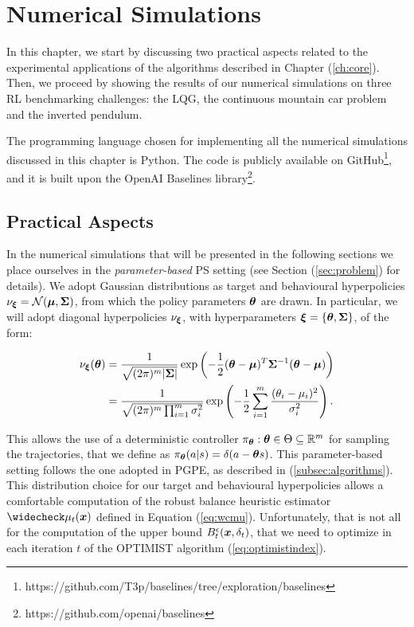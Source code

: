
\chapter{Numerical Simulations} \label{ch:experiments}
In this chapter, we start by discussing two practical aspects related to the experimental applications of the algorithms described in Chapter (\ref{ch:core}). Then, we proceed by showing the results of our numerical simulations on three \gls{RL} benchmarking challenges: the \gls{LQG}, the continuous mountain car problem and the inverted pendulum.

The programming language chosen for implementing all the numerical simulations discussed in this chapter is Python. The code is publicly available on GitHub\footnote{https://github.com/T3p/baselines/tree/exploration/baselines}, and it is built upon the OpenAI Baselines library\footnote{https://github.com/openai/baselines}.

\section{Practical Aspects} \label{sec:practical}
In the numerical simulations that will be presented in the following sections we place ourselves in the \emph{parameter-based} \gls{PS} setting (see Section (\ref{sec:problem}) for details). We adopt Gaussian distributions as target and behavioural hyperpolicies $\nu_{\boldsymbol{\xi}}= \mathcal{N}(\boldsymbol{\mu},\boldsymbol{\Sigma})$, from which the policy parameters $\boldsymbol{\theta}$ are drawn. In particular, we will adopt diagonal hyperpolicies $\nu_{\boldsymbol{\xi}}$, with hyperparameters $\boldsymbol{\xi}=\{\boldsymbol{\theta},\boldsymbol{\Sigma}\}$, of the form: 

\begin{align}
\nu_{\boldsymbol{\xi}}(\boldsymbol{\theta}) & = \frac{1}{\sqrt{(2\pi)^m |\boldsymbol{\Sigma} |}}\exp\left(
	-\frac{1}{2} (\boldsymbol{\theta} - \boldsymbol{\mu} )^T\boldsymbol{\Sigma}^{-1}(\boldsymbol{\theta} - \boldsymbol{\mu} )\right)\\
	& = \frac{1}{\sqrt{(2\pi)^m \prod_{i=1}^{m} \sigma_{i}^2}}\exp\left(
	-\frac{1}{2} \sum\limits_{i=1}^m\frac{(\theta_{i}-\mu_{i})^2}{\sigma_{i}^2}\right).
\end{align}

This allows the use of a deterministic controller $\pi_{\boldsymbol{\theta}}: \boldsymbol{\theta}\in\Theta\subseteq\mathbb{R}^m$ for sampling the trajectories, that we define as $\pi_{\boldsymbol{\theta}}(a|s)=\delta(a-\boldsymbol{\theta} s)$. This parameter-based setting follows the one adopted in \gls{PGPE}, as described in (\ref{subsec:algorithms}). \\
This distribution choice for our target and behavioural hyperpolicies allows a comfortable computation of the robust balance heuristic estimator $\wc{\mu}_t(\vx)$ defined in Equation (\ref{eq:wcmu}). Unfortunately, that is not all for the computation of the upper bound $B_t^{\epsilon}(\boldsymbol{x},\delta_t)$, that we need to optimize in each iteration $t$ of the \gls{OPTIMIST} algorithm (\ref{eq:optimistindex}).

